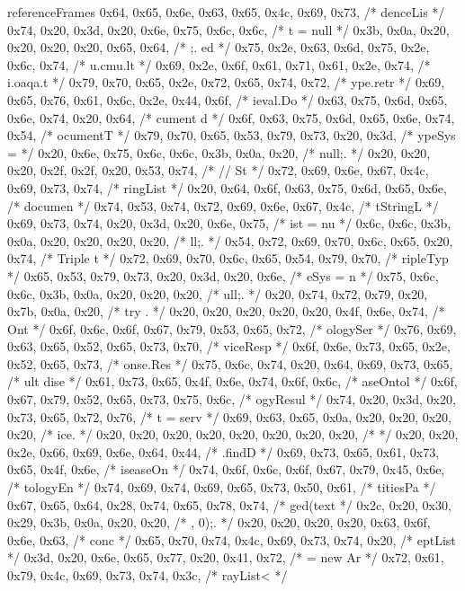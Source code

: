 \begin{chunk}{referenceFrames}
{{{{0x64, 0x65, 0x6e, 0x63, 0x65, 0x4c, 0x69, 0x73, /* denceLis */
0x74, 0x20, 0x3d, 0x20, 0x6e, 0x75, 0x6c, 0x6c, /* t = null */
0x3b, 0x0a, 0x20, 0x20, 0x20, 0x20, 0x65, 0x64, /* ;.    ed */
0x75, 0x2e, 0x63, 0x6d, 0x75, 0x2e, 0x6c, 0x74, /* u.cmu.lt */
0x69, 0x2e, 0x6f, 0x61, 0x71, 0x61, 0x2e, 0x74, /* i.oaqa.t */
0x79, 0x70, 0x65, 0x2e, 0x72, 0x65, 0x74, 0x72, /* ype.retr */
0x69, 0x65, 0x76, 0x61, 0x6c, 0x2e, 0x44, 0x6f, /* ieval.Do */
0x63, 0x75, 0x6d, 0x65, 0x6e, 0x74, 0x20, 0x64, /* cument d */
0x6f, 0x63, 0x75, 0x6d, 0x65, 0x6e, 0x74, 0x54, /* ocumentT */
0x79, 0x70, 0x65, 0x53, 0x79, 0x73, 0x20, 0x3d, /* ypeSys = */
0x20, 0x6e, 0x75, 0x6c, 0x6c, 0x3b, 0x0a, 0x20, /*  null;.  */
0x20, 0x20, 0x20, 0x2f, 0x2f, 0x20, 0x53, 0x74, /*    // St */
0x72, 0x69, 0x6e, 0x67, 0x4c, 0x69, 0x73, 0x74, /* ringList */
0x20, 0x64, 0x6f, 0x63, 0x75, 0x6d, 0x65, 0x6e, /*  documen */
0x74, 0x53, 0x74, 0x72, 0x69, 0x6e, 0x67, 0x4c, /* tStringL */
0x69, 0x73, 0x74, 0x20, 0x3d, 0x20, 0x6e, 0x75, /* ist = nu */
0x6c, 0x6c, 0x3b, 0x0a, 0x20, 0x20, 0x20, 0x20, /* ll;.     */
0x54, 0x72, 0x69, 0x70, 0x6c, 0x65, 0x20, 0x74, /* Triple t */
0x72, 0x69, 0x70, 0x6c, 0x65, 0x54, 0x79, 0x70, /* ripleTyp */
0x65, 0x53, 0x79, 0x73, 0x20, 0x3d, 0x20, 0x6e, /* eSys = n */
0x75, 0x6c, 0x6c, 0x3b, 0x0a, 0x20, 0x20, 0x20, /* ull;.    */
0x20, 0x74, 0x72, 0x79, 0x20, 0x7b, 0x0a, 0x20, /*  try {.  */
0x20, 0x20, 0x20, 0x20, 0x20, 0x4f, 0x6e, 0x74, /*      Ont */
0x6f, 0x6c, 0x6f, 0x67, 0x79, 0x53, 0x65, 0x72, /* ologySer */
0x76, 0x69, 0x63, 0x65, 0x52, 0x65, 0x73, 0x70, /* viceResp */
0x6f, 0x6e, 0x73, 0x65, 0x2e, 0x52, 0x65, 0x73, /* onse.Res */
0x75, 0x6c, 0x74, 0x20, 0x64, 0x69, 0x73, 0x65, /* ult dise */
0x61, 0x73, 0x65, 0x4f, 0x6e, 0x74, 0x6f, 0x6c, /* aseOntol */
0x6f, 0x67, 0x79, 0x52, 0x65, 0x73, 0x75, 0x6c, /* ogyResul */
0x74, 0x20, 0x3d, 0x20, 0x73, 0x65, 0x72, 0x76, /* t = serv */
0x69, 0x63, 0x65, 0x0a, 0x20, 0x20, 0x20, 0x20, /* ice.     */
0x20, 0x20, 0x20, 0x20, 0x20, 0x20, 0x20, 0x20, /*          */
0x20, 0x20, 0x2e, 0x66, 0x69, 0x6e, 0x64, 0x44, /*   .findD */
0x69, 0x73, 0x65, 0x61, 0x73, 0x65, 0x4f, 0x6e, /* iseaseOn */
0x74, 0x6f, 0x6c, 0x6f, 0x67, 0x79, 0x45, 0x6e, /* tologyEn */
0x74, 0x69, 0x74, 0x69, 0x65, 0x73, 0x50, 0x61, /* titiesPa */
0x67, 0x65, 0x64, 0x28, 0x74, 0x65, 0x78, 0x74, /* ged(text */
0x2c, 0x20, 0x30, 0x29, 0x3b, 0x0a, 0x20, 0x20, /* , 0);.   */
0x20, 0x20, 0x20, 0x20, 0x63, 0x6f, 0x6e, 0x63, /*     conc */
0x65, 0x70, 0x74, 0x4c, 0x69, 0x73, 0x74, 0x20, /* eptList  */
0x3d, 0x20, 0x6e, 0x65, 0x77, 0x20, 0x41, 0x72, /* = new Ar */
0x72, 0x61, 0x79, 0x4c, 0x69, 0x73, 0x74, 0x3c, /* rayList< */
}}}}}
\end{chunk}
